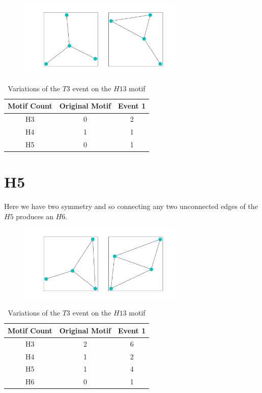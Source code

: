 \begin{figure}[!ht]
    \includegraphics[width=8cm]{Images/H4_T3_evolution.png}
    \centering
\end{figure}

\begin{table}
    \centering
    \begin{tabular}{||c c c||} 
    \hline
    Motif Count & Original Motif & Event 1 \\ [0.5ex] 
    \hline
    H3 & 0 & 2 \\ 
    \hline
    H4 & 1 & 1 \\
    \hline
    H5 & 0 & 1 \\
    \hline
   \end{tabular}
   \caption{Variations of the $T3$ event on the $H13$ motif}
   \label{table:13}
\end{table}

\section{H5}
Here we have two symmetry and so connecting any two unconnected edges of the $H5$ produces an $H6$.

\begin{figure}[!ht]
    \includegraphics[width=8cm]{Images/H5_T3_evolution.png}
    \centering
\end{figure}

\begin{table}
    \centering
    \begin{tabular}{||c c c||} 
    \hline
    Motif Count & Original Motif & Event 1 \\ [0.5ex] 
    \hline\hline
    H3 & 2 & 6\\ 
    \hline
    H4 & 1 & 2 \\
    \hline
    H5 & 1 & 4\\
    \hline
    H6 & 0 & 1\\
    \hline
   \end{tabular}
   \caption{Variations of the $T3$ event on the $H13$ motif}
   \label{table:14}
\end{table}

